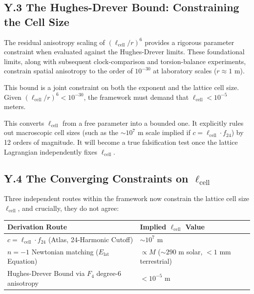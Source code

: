 \documentclass[11pt, letterpaper, openany]{book}
\begin{document}
\subsection*{Y.3 The Hughes-Drever Bound: Constraining the Cell Size}

The residual anisotropy scaling of $(\ell_{\text{cell}}/r)^6$ provides a rigorous parameter constraint when evaluated against the Hughes-Drever limits. These foundational limits, along with subsequent clock-comparison and torsion-balance experiments, constrain spatial anisotropy to the order of $10^{-30}$ at laboratory scales ($r \approx 1$ m). 

This bound is a joint constraint on both the exponent and the lattice cell size. Given $(\ell_{\text{cell}}/r)^6 < 10^{-30}$, the framework must demand that $\ell_{\text{cell}} < 10^{-5}$ meters. 

This converts $\ell_{\text{cell}}$ from a free parameter into a bounded one. It explicitly rules out macroscopic cell sizes (such as the $\sim 10^7$ m scale implied if $c = \ell_{\text{cell}} \cdot f_{24}$) by 12 orders of magnitude. It will become a true falsification test once the lattice Lagrangian independently fixes $\ell_{\text{cell}}$.

\subsection*{Y.4 The Converging Constraints on $\ell_{\text{cell}}$}

Three independent routes within the framework now constrain the lattice cell size $\ell_{\text{cell}}$, and crucially, they do not agree:

\vspace{0.3cm}
\begin{center}
\renewcommand{\arraystretch}{1.3}
\begin{tabular}{|l|l|}
\hline
\rowcolor{kishblue!12}
\textbf{Derivation Route} & \textbf{Implied $\ell_{\text{cell}}$ Value} \\
\hline
$c = \ell_{\text{cell}} \cdot f_{24}$ (Atlas, 24-Harmonic Cutoff) & $\sim 10^7$ m \\
\hline
$n = -1$ Newtonian matching ($E_{\mathrm{lat}}$ Equation) & $\propto M$ ($\sim 290$ m solar, $<1$ mm terrestrial) \\
\hline
Hughes-Drever Bound via $F_4$ degree-6 anisotropy & $< 10^{-5}$ m \\
\hline
\end{tabular}
\end{center}
\vspace{0.3cm}
\end{document}
